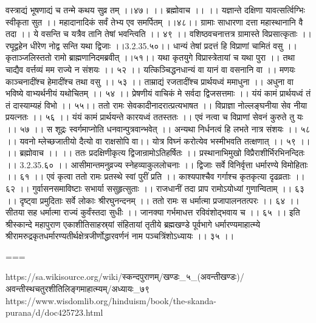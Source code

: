 वस्त्राद्यं भूषणाद्यं च तन्मे कथय सुव्र तम् ।।४७। ।।
ब्रह्मोवाच ।। ।।
यज्ञान्ते दक्षिणा यावत्सर्त्विग्भिः स्वीकृता सुत ।।
महादानादिकं सर्वं तेभ्य एव समर्पितम् ।।४८।।
ग्रामाः साधारणा दत्ता महास्थानानि वै तदा ।।
ये वसन्ति च यत्रैव तानि तेषां भवन्त्विति ।। ४९ ।।
वशिष्ठवचनात्तत्र ग्रामास्ते विप्रसात्कृताः ।।
रघूद्वहेन धीरेण नोद्व सन्ति यथा द्विजाः ।।3.2.35.५०।।
धान्यं तेषां प्रदत्तं हि विप्राणां चामितं वसु ।।
कृताञ्जलिस्ततो रामो ब्राह्मणानिदमब्रवीत् ।।५१।।
यथा कृतयुगे विप्रास्त्रेतायां च यथा पुरा ।।
तथा चाद्यैव वर्त्तव्यं मम राज्ये न संशयः ।। ५२ ।।
यत्किञ्चिद्धनधान्यं वा यानं वा वसनानि वा ।।
मणयः काञ्चनादींश्च हेमादींश्च तथा वसु ।। ५३ ।।
ताम्राद्यं रजतादींश्च प्रार्थयध्वं ममाधुना ।।
अधुना वा भविष्ये वाभ्यर्थनीयं यथोचितम् ।। ५४ ।।
प्रेषणीयं वाचिकं मे सर्वदा द्विजसत्तमाः ।।
यंयं कामं प्रार्थयध्वं तं तं दास्याम्यहं विभो ।। ५५।।
ततो रामः सेवकादीनादरात्प्रत्यभाषत ।।
विप्राज्ञा नोल्लङ्घनीया सेव नीया प्रयत्नतः ।। ५६ ।।
यंयं कामं प्रार्थयन्ते कारयध्वं ततस्ततः ।।
एवं नत्वा च विप्राणां सेवनं कुरुते तु यः ।। ५७ ।।
स शूद्रः स्वर्गमाप्नोति धनवान्पुत्रवान्भवेत् ।।
अन्यथा निर्धनत्वं हि लभते नात्र संशयः ।। ५८ ।।
यवनो म्लेच्छजातीयो दैत्यो वा राक्षसोपि वा।।
योत्र विघ्नं करोत्येव भस्मीभवति तत्क्षणात् ।। ५९ ।।
।। ब्रह्मोवाच ।। ।।
ततः प्रदक्षिणीकृत्य द्विजान्रामोऽतिहर्षितः ।।
प्रस्थानाभिमुखो विप्रैराशीर्भिरभिनन्दितः ।। 3.2.35.६० ।।
आसीमान्तमनुव्रज्य स्नेहव्याकुललोचनाः ।।
द्विजाः सर्वे विनिर्वृत्ता धर्मारण्ये विमोहिताः ।। ६१ ।।
एवं कृत्वा ततो रामः प्रतस्थे स्वां पुरीं प्रति ।।
काश्यपाश्चैव गर्गाश्च कृतकृत्या दृढव्रताः ।। ६२ ।।
गुर्वासनसमाविष्टाः सभार्या ससुहृत्सुताः ।।
राजधानीं तदा प्राप रामोऽयोध्यां गुणान्विताम् ।। ६३ ।।
दृष्ट्वा प्रमुदिताः सर्वे लोकाः श्रीरघुनन्दनम् ।।
ततो रामः स धर्मात्मा प्रजापालनतत्परः ।। ६४ ।।
सीतया सह धर्मात्मा राज्यं कुर्वंस्तदा सुधीः ।।
जानक्या गर्भमाधत्त रविवंशोद्भवाय च ।। ६५ ।।
इति श्रीस्कान्दे महापुराण एकाशीतिसाहस्र्यां संहितायां तृतीये ब्रह्मखण्डे पूर्वभागे धर्मारण्यमाहात्म्ये श्रीरामरुद्रकृतधर्मारण्यतीर्थक्षेत्रजीर्णोद्धारवर्णनं नाम पञ्चत्रिंशोऽध्यायः ।। ३५ ।।

===

https://sa.wikisource.org/wiki/स्कन्दपुराणम्/खण्डः_५_(अवन्तीखण्डः)/अवन्तीस्थचतुरशीतिलिङ्गमाहात्म्यम्/अध्यायः_७९
https://www.wisdomlib.org/hinduism/book/the-skanda-purana/d/doc425723.html


